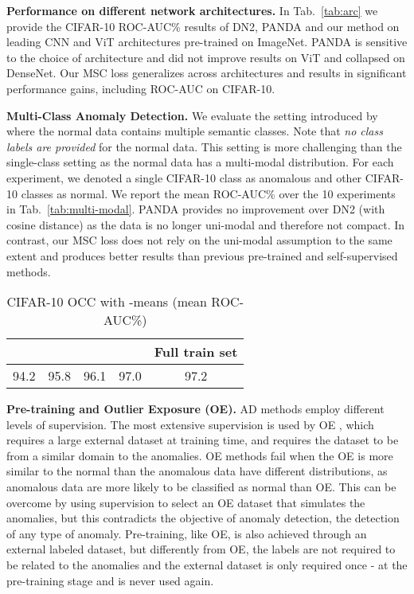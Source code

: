 \documentclass[letterpaper]{article} \usepackage{aaai23}  \usepackage{times}  \usepackage{helvet}  \usepackage{courier}  \usepackage[hyphens]{url}  \usepackage{graphicx} \usepackage{amsmath, amssymb}
\begin{document}
\textbf{Performance on different network architectures.} In Tab.~\ref{tab:arc} we provide the CIFAR-10 ROC-AUC\% results of DN2, PANDA and our method on leading CNN and ViT architectures pre-trained on ImageNet. PANDA is sensitive to the choice of architecture and did not improve results on ViT and collapsed on DenseNet. Our MSC loss generalizes across architectures and results in significant performance gains, including  ROC-AUC on CIFAR-10.


\textbf{Multi-Class Anomaly Detection.} We evaluate the setting introduced by \cite{ahmed2020detecting} where the normal data contains multiple semantic classes. Note that \textit{no class labels are provided} for the normal data. This setting is more challenging than the single-class setting as the normal data has a multi-modal distribution. For each experiment, we denoted a single CIFAR-10 class as anomalous and other CIFAR-10 classes as normal. We report the mean ROC-AUC\% over the 10 experiments in Tab.~\ref{tab:multi-modal}. PANDA provides no improvement over DN2 (with cosine distance) as the data is no longer uni-modal and therefore not compact. In contrast, our MSC loss does not rely on the uni-modal assumption to the same extent and produces better results than previous pre-trained and self-supervised methods.

\begin{table}[t]
  \centering
  \begin{tabular}{ccccc}
    \toprule
 &  &  &  & Full train set \\
\midrule
94.2 & 95.8 & 96.1 & 97.0 & 97.2  \\
    \bottomrule
  \end{tabular}
\caption{CIFAR-10 OCC with -means (mean ROC-AUC\%)}
\label{tab:kmeans}
\end{table}


\textbf{Pre-training and Outlier Exposure (OE).} AD methods employ different levels of supervision. The most extensive supervision is used by OE \cite{deecke2021transfer,ruff2020rethinking}, which requires a large external dataset at training time, and requires the dataset to be from a similar domain to the anomalies. OE methods fail when the OE is more similar to the normal than the anomalous data have different distributions, as anomalous data are more likely to be classified as normal than OE. This can be overcome by using supervision to select an OE dataset that simulates the anomalies, but this contradicts the objective of anomaly detection, the detection of any type of anomaly. Pre-training, like OE, is also achieved through an external labeled dataset, but differently from OE, the labels are not required to be related to the anomalies and the external dataset is only required once - at the pre-training stage and is never used again.
\end{document}
